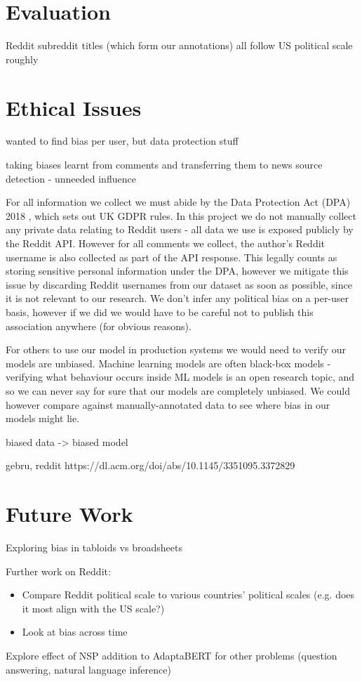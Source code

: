 \section{Evaluation}

Reddit subreddit titles (which form our annotations) all follow US political scale roughly

\section{Ethical Issues}


wanted to find bias per user, but data protection stuff

taking biases learnt from comments and transferring them to news source detection - unneeded influence



For all information we collect we must abide by the Data Protection Act (DPA) 2018 \cite{dpa}, which sets out UK GDPR rules. In this project we do not manually collect any private data relating to Reddit users - all data we use is exposed publicly by the Reddit API. However for all comments we collect, the author's Reddit username is also collected as part of the API response. This legally counts as storing sensitive personal information under the DPA, however we mitigate this issue by discarding Reddit usernames from our dataset as soon as possible, since it is not relevant to our research. We don't infer any political bias on a per-user basis, however if we did we would have to be careful not to publish this association anywhere (for obvious reasons).

For others to use our model in production systems we would need to verify our models are unbiased. Machine learning models are often black-box models - verifying what behaviour occurs inside ML models is an open research topic, and so we can never say for sure that our models are completely unbiased. We could however compare against manually-annotated data to see where bias in our models might lie.


biased data -> biased model

gebru, reddit
https://dl.acm.org/doi/abs/10.1145/3351095.3372829


\section{Future Work}

Exploring bias in tabloids vs broadsheets

Further work on Reddit:
\begin{itemize}
    \item Compare Reddit political scale to various countries' political scales (e.g. does it most align with the US scale?)
    \item Look at bias across time
\end{itemize}

Explore effect of NSP addition to AdaptaBERT for other problems (question answering, natural language inference)

